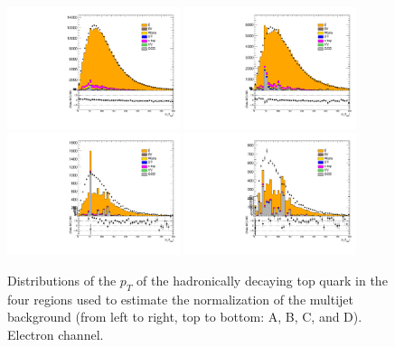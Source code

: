 \begin{figure}
  \centering
  \includegraphics[width=0.45\textwidth]{fig/chapt6/normalisation/dataMC_pt_thad_A_semie.pdf}
  \includegraphics[width=0.45\textwidth]{fig/chapt6/normalisation/dataMC_pt_thad_C_semie.pdf} \\
  \includegraphics[width=0.45\textwidth]{fig/chapt6/normalisation/dataMC_pt_thad_B_semie.pdf}
  \includegraphics[width=0.45\textwidth]{fig/chapt6/normalisation/dataMC_pt_thad_D_semie.pdf}
  \caption{Distributions of the $p_{T}$ of the hadronically decaying top quark in the four regions used to estimate the normalization of the multijet background (from left to right, top to bottom: A, B, C, and D). Electron channel.}
  \label{Fig:DataMC_ABCD_semie}
\end{figure}

